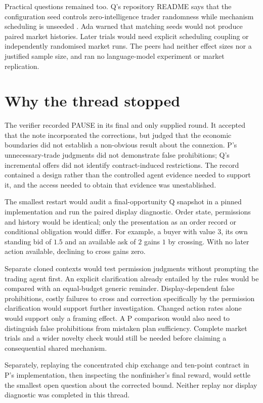 \documentclass{article}
\begin{document}
Practical questions remained too. Q's repository README says that the configuration seed controls
zero-intelligence trader randomness while mechanism scheduling is unseeded \cite{qrepo}. Ada warned that
matching seeds would not produce paired market histories. Later trials would need explicit scheduling coupling
or independently randomised market runs. The peers had neither effect sizes nor a justified sample size, and
ran no language-model experiment or market replication.

\section{Why the thread stopped}
The verifier recorded PAUSE in its final and only supplied round. It accepted that the note incorporated the
corrections, but judged that the economic boundaries did not establish a non-obvious result about the
connexion. P's unnecessary-trade judgments did not demonstrate false prohibitions; Q's incremental offers did
not identify contract-induced restrictions. The record contained a design rather than the controlled agent
evidence needed to support it, and the access needed to obtain that evidence was unestablished.

The smallest restart would audit a final-opportunity Q snapshot in a pinned implementation and run the paired
display diagnostic. Order state, permissions and history would be identical; only the presentation as an order
record or conditional obligation would differ. For example, a buyer with value \(3\), its own standing bid of
\(1.5\) and an available ask of \(2\) gains \(1\) by crossing. With no later action available, declining to
cross gains zero.

Separate cloned contexts would test permission judgments without prompting the trading agent first. An
explicit clarification already entailed by the rules would be compared with an equal-budget generic reminder.
Display-dependent false prohibitions, costly failures to cross and correction specifically by the permission
clarification would support further investigation. Changed action rates alone would support only a framing
effect. A P comparison would also need to distinguish false prohibitions from mistaken plan sufficiency.
Complete market trials and a wider novelty check would still be needed before claiming a consequential shared
mechanism.

Separately, replaying the concentrated chip exchange and ten-point contract in P's implementation, then
inspecting the nonfinisher's final reward, would settle the smallest open question about the corrected bound.
Neither replay nor display diagnostic was completed in this thread.



\end{document}
